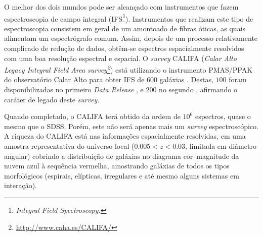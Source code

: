 
O melhor dos dois mundos pode ser alcançado com instrumentos que fazem
espectroscopia de campo integral (IFS\footnote{\em Integral Field
Spectroscopy.}). Instrumentos que realizam este tipo de espectroscopia consistem
em geral de um amontoado de fibras óticas, as quais alimentam um espectrógrafo
comum. Assim, depois de um processo relativamente complicado de redução de
dados, obtêm-se espectros espacialmente resolvidos com uma boa resolução
espectral e espacial. O {\em survey} CALIFA ({\em Calar Alto Legacy Integral
Field Area survey\footnote{\url{http://www.caha.es/CALIFA/}}}) está utilizando o
instrumento PMAS/PPAK do observatório Calar Alto para obter IFS de $600$
galáxias \citep{Sanchez2012}. Destas, $100$ foram disponibilizadas no primeiro
{\em Data Release} \citep[DR1]{Husemann2013}, e $200$ no segundo
\citep{GarciaBenito2015}, afirmando o caráter de legado deste {\em survey}.

Quando completado, o CALIFA terá obtido da ordem de $10^6$ espectros, quase o
mesmo que o SDSS. Porém, este não será apenas mais um {\em survey}
espectroscópico. A riqueza do CALIFA está nas informações espacialmente
resolvidas, em uma amostra representativa do universo local ($0.005 < z < 0.03$,
limitada em diâmetro angular) cobrindo a distribuição de galáxias no diagrama
cor--magnitude da nuvem azul à sequência vermelha, amostrando galáxias de todos
os tipos morfológicos (espirais, elípticas, irregulares e até mesmo alguns
sistemas em interação).

